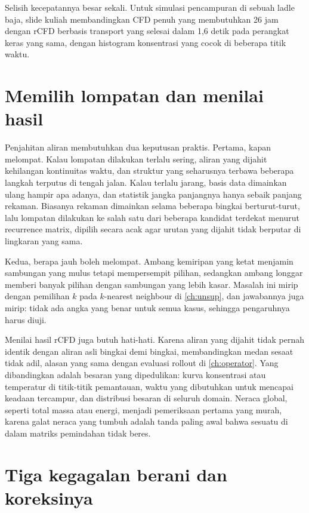 Selisih kecepatannya besar sekali. Untuk simulasi pencampuran di sebuah ladle baja, slide kuliah membandingkan CFD
penuh yang membutuhkan 26 jam dengan rCFD berbasis transport yang selesai dalam 1,6 detik pada perangkat
keras yang sama, dengan histogram konsentrasi yang cocok di beberapa titik waktu.

\section{Memilih lompatan dan menilai hasil}

Penjahitan aliran membutuhkan dua keputusan praktis. Pertama, kapan melompat. Kalau lompatan dilakukan terlalu sering,
aliran yang dijahit kehilangan kontinuitas waktu, dan struktur yang seharusnya terbawa beberapa langkah terputus di
tengah jalan. Kalau terlalu jarang, basis data dimainkan ulang hampir apa adanya, dan statistik jangka panjangnya hanya
sebaik panjang rekaman. Biasanya rekaman dimainkan selama beberapa bingkai berturut-turut, lalu lompatan dilakukan ke salah
satu dari beberapa kandidat terdekat menurut recurrence matrix, dipilih secara acak agar urutan yang dijahit tidak berputar
di lingkaran yang sama.

Kedua, berapa jauh boleh melompat. Ambang kemiripan yang ketat menjamin sambungan yang mulus tetapi mempersempit pilihan,
sedangkan ambang longgar memberi banyak pilihan dengan sambungan yang lebih kasar. Masalah ini mirip dengan pemilihan $k$
pada $k$-nearest neighbour di \cref{ch:unsup}, dan jawabannya juga mirip: tidak ada angka yang benar untuk semua kasus,
sehingga pengaruhnya harus diuji.

Menilai hasil rCFD juga butuh hati-hati. Karena aliran yang dijahit tidak pernah identik dengan aliran asli bingkai demi
bingkai, membandingkan medan sesaat tidak adil, alasan yang sama dengan evaluasi rollout di \cref{ch:operator}. Yang
dibandingkan adalah besaran yang dipedulikan: kurva konsentrasi atau temperatur di titik-titik pemantauan, waktu yang
dibutuhkan untuk mencapai keadaan tercampur, dan distribusi besaran di seluruh domain. Neraca global, seperti total massa
atau energi, menjadi pemeriksaan pertama yang murah, karena galat neraca yang tumbuh adalah tanda paling awal bahwa
sesuatu di dalam matriks pemindahan tidak beres.

\section{Tiga kegagalan berani dan koreksinya}

